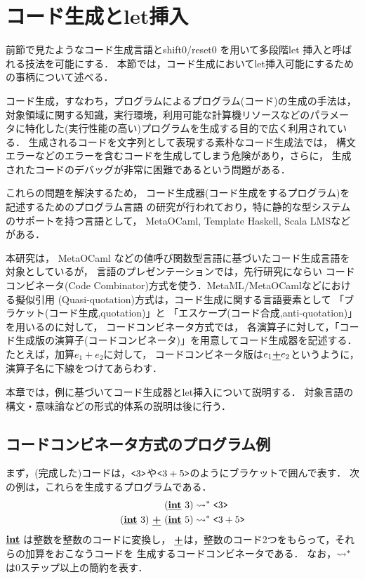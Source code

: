 \section{コード生成とlet挿入}
前節で見たようなコード生成言語とshift0/reset0 を用いて多段階let 挿入と呼ばれる技法を可能にする．
本節では，コード生成においてlet挿入可能にするための事柄について述べる．

コード生成，すなわち，プログラムによるプログラム(コード)の生成の手法は，
対象領域に関する知識，実行環境，利用可能な計算機リソースなどのパラメー
タに特化した(実行性能の高い)プログラムを生成する目的で広く利用されている．
生成されるコードを文字列として表現する素朴なコード生成法では，
構文エラーなどのエラーを含むコードを生成してしまう危険があり，さらに，
生成されたコードのデバッグが非常に困難であるという問題がある．

これらの問題を解決するため，
コード生成器(コード生成をするプログラム)を記述するためのプログラム言語
の研究が行われており，特に静的な型システムのサポートを持つ言語として，
MetaOCaml, Template Haskell, Scala LMSなどがある．

本研究は，
MetaOCaml などの値呼び関数型言語に基づいたコード生成言語を対象としているが，
言語のプレゼンテーションでは，先行研究にならい
コードコンビネータ(Code Combinator)方式を使う．MetaML/MetaOCamlなどにおける擬似引用
(Quasi-quotation)方式は，コード生成に関する言語要素として
「ブラケット(コード生成,quotation)」と
「エスケープ(コード合成,anti-quotation)」を用いるのに対して，
コードコンビネータ方式では，
各演算子に対して，「コード生成版の演算子(コードコンビネータ)」を用意してコード生成器を記述する．
たとえば，加算$e_1+e_2$に対して，
コードコンビネータ版は$e_1 \underline{\textbf{+}} e_2$というように，
演算子名に下線をつけてあらわす．

本章では，例に基づいてコード生成器とlet挿入について説明する．
対象言語の構文・意味論などの形式的体系の説明は後に行う．

\subsection{コードコンビネータ方式のプログラム例}

まず，(完成した)コードは，$\texttt{<}{3}\texttt{>}$や$\texttt{<}{3+5}\texttt{>}$のようにブラケットで囲んで表す．
次の例は，これらを生成するプログラムである．
\begin{align*}
  (\underline{\textbf{int}}~3)   & \leadsto^* \texttt{<}{3}\texttt{>} \\
  (\underline{\textbf{int}}~3)~ \underline{\textbf{+}}~ (\underline{\textbf{int}}~5) & \leadsto^* \texttt{<}{3 + 5}\texttt{>}
\end{align*}
$\underline{\textbf{int}}$ は整数を整数のコードに変換し，
$\underline{\textbf{+}}$は，整数のコード2つをもらって，それらの加算をおこなうコードを
生成するコードコンビネータである．
なお，$\leadsto^*$は0ステップ以上の簡約を表す．

